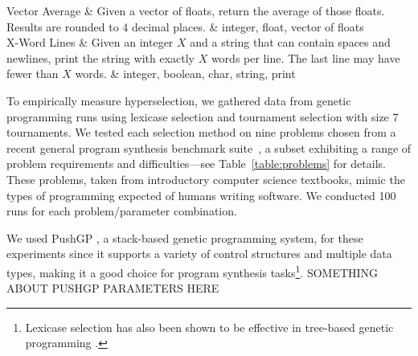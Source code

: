 \documentclass{sig-alternate}
\begin{document}
\begin{table}[t]
\begin{tabu}
		Vector Average             & Given a vector of floats, return the average of those floats. Results are rounded to 4 decimal places. & integer, float, vector of floats \\
		X-Word Lines               & Given an integer $X$  and a string that can contain spaces and newlines, print the string with exactly $X$ words per line. The last line may have fewer than $X$ words. & integer, boolean, char, string, print \\
		\bottomrule
	\end{tabu}
\end{table}


To empirically measure hyperselection, we gathered data from genetic programming runs using lexicase selection and tournament selection with size 7 tournaments. We tested each selection method on nine problems chosen from a recent general program synthesis benchmark suite~\cite{Helmuth:2015:GECCO}, a subset exhibiting a range of problem requirements and difficulties---see Table~\ref{table:problems} for details. These problems, taken from introductory computer science textbooks, mimic the types of programming expected of humans writing software. We conducted 100 runs for each problem/parameter combination.

We used PushGP \cite{spector:2002:GPEM, 1068292}, a stack-based genetic programming system, for these experiments since it supports a variety of control structures and multiple data types, making it a good choice for program synthesis tasks\footnote{Lexicase selection has also been shown to be effective in tree-based genetic programming \cite{Helmuth:2014:ieeeTEC, Krawiec:2015:GECCO:smgpWorkshop}.}. SOMETHING ABOUT PUSHGP PARAMETERS HERE
\end{document}
